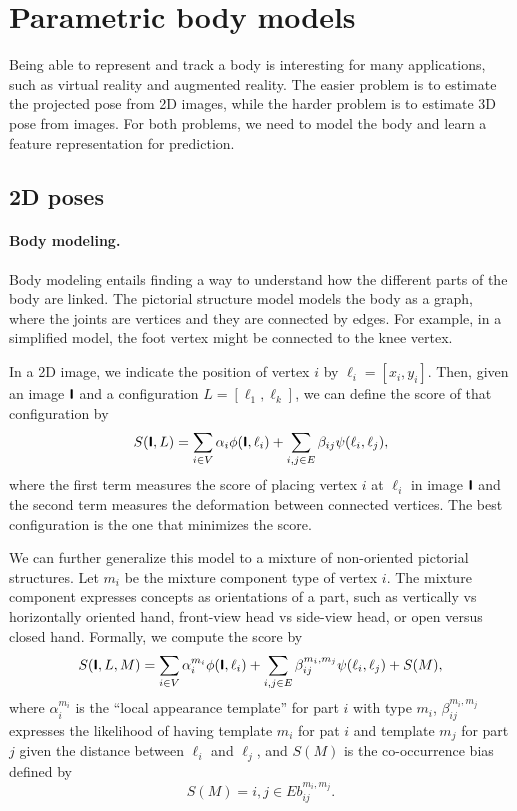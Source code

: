\section{Parametric body models}

Being able to represent and track a body is interesting for many applications, such as virtual
reality and augmented reality. The easier problem is to estimate the projected pose from 2D images,
while the harder problem is to estimate 3D pose from images. For both problems, we need to model
the body and learn a feature representation for prediction.

\subsection{2D poses}

\paragraph{Body modeling.}

Body modeling entails finding a way to understand how the different parts of the body are linked.
The pictorial structure model models the body as a graph, where the joints are vertices and they
are connected by edges. For example, in a simplified model, the foot vertex might be connected to
the knee vertex.

In a 2D image, we indicate the position of vertex $i$ by $\ell_i = [x_i, y_i]$. Then, given an
image $\bm{\mathsf{I}}$ and a configuration $L = [\ell_1, \ell_k]$, we can define the score of that
configuration by \[
    S(\bm{\mathsf{I}}, L) = \sum_{i \in V} \alpha_i \phi(\bm{\mathsf{I}}, \ell_i) + \sum_{i,j \in E} \beta_{ij} \psi(\ell_i, \ell_j),
\]
where the first term measures the score of placing vertex $i$ at $\ell_i$ in image $\bm{\mathsf{I}}$ and
the second term measures the deformation between connected vertices. The best configuration is the
one that minimizes the score.

We can further generalize this model to a mixture of non-oriented pictorial structures. Let $m_i$
be the mixture component type of vertex $i$. The mixture component expresses concepts as
orientations of a part, such as vertically vs horizontally oriented hand, front-view head vs
side-view head, or open versus closed hand. Formally, we compute the score by \[
    S(\bm{\mathsf{I}}, L, M) = \sum_{i \in V} \alpha_i^{m_i} \phi(\bm{\mathsf{I}}, \ell_i) + \sum_{i,j \in E} \beta_{ij}^{m_i,m_j} \psi(\ell_i, \ell_j)+ S(M),
\]
where $\alpha_i^{m_i}$ is the ``local appearance template'' for part $i$ with type $m_i$,
$\beta_{ij}^{m_i,m_j}$ expresses the likelihood of having template $m_i$ for pat $i$ and template
$m_j$ for part $j$ given the distance between $\ell_i$ and $\ell_j$, and $S(M)$ is the
co-occurrence bias defined by \[
    S(M) = {i,j\in E} b_{ij}^{m_i,m_j}.
\]

